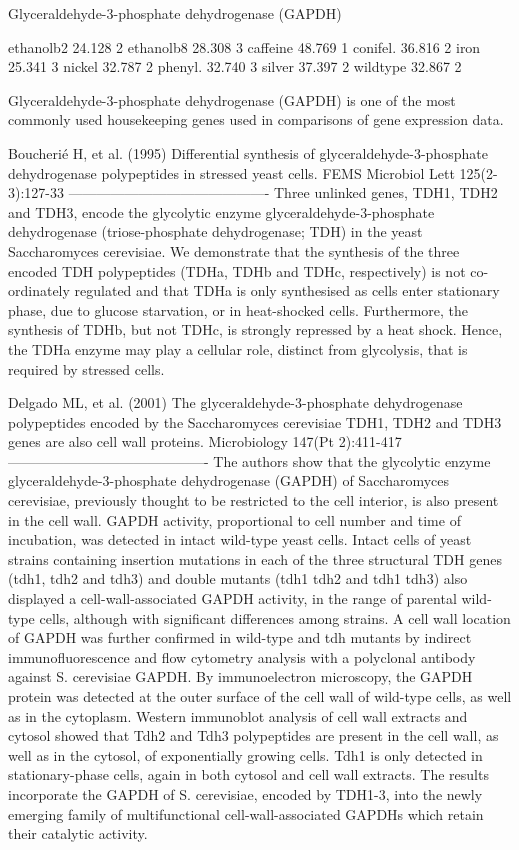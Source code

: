 Glyceraldehyde-3-phosphate dehydrogenase (GAPDH)

ethanolb2 24.128  2
ethanolb8 28.308  3
caffeine  48.769  1
conifel.  36.816  2
iron      25.341  3
nickel    32.787  2
phenyl.   32.740  3
silver    37.397  2
wildtype  32.867  2

Glyceraldehyde-3-phosphate dehydrogenase (GAPDH) is one of the most commonly used housekeeping genes used in comparisons of gene expression data.




Boucherié H, et al. (1995) Differential synthesis of glyceraldehyde-3-phosphate dehydrogenase polypeptides in stressed yeast cells. FEMS Microbiol Lett 125(2-3):127-33
 -------------------------------------------
Three unlinked genes, TDH1, TDH2 and TDH3, encode the glycolytic enzyme glyceraldehyde-3-phosphate dehydrogenase (triose-phosphate dehydrogenase; TDH) in the yeast Saccharomyces cerevisiae. We demonstrate that the synthesis of the three encoded TDH polypeptides (TDHa, TDHb and TDHc, respectively) is not co-ordinately regulated and that TDHa is only synthesised as cells enter stationary phase, due to glucose starvation, or in heat-shocked cells. Furthermore, the synthesis of TDHb, but not TDHc, is strongly repressed by a heat shock. Hence, the TDHa enzyme may play a cellular role, distinct from glycolysis, that is required by stressed cells.


Delgado ML, et al. (2001) The glyceraldehyde-3-phosphate dehydrogenase polypeptides encoded by the Saccharomyces cerevisiae TDH1, TDH2 and TDH3 genes are also cell wall proteins. Microbiology 147(Pt 2):411-417
-------------------------------------------
The authors show that the glycolytic enzyme glyceraldehyde-3-phosphate dehydrogenase (GAPDH) of Saccharomyces cerevisiae, previously thought to be restricted to the cell interior, is also present in the cell wall. GAPDH activity, proportional to cell number and time of incubation, was detected in intact wild-type yeast cells. Intact cells of yeast strains containing insertion mutations in each of the three structural TDH genes (tdh1, tdh2 and tdh3) and double mutants (tdh1 tdh2 and tdh1 tdh3) also displayed a cell-wall-associated GAPDH activity, in the range of parental wild-type cells, although with significant differences among strains. A cell wall location of GAPDH was further confirmed in wild-type and tdh mutants by indirect immunofluorescence and flow cytometry analysis with a polyclonal antibody against S. cerevisiae GAPDH. By immunoelectron microscopy, the GAPDH protein was detected at the outer surface of the cell wall of wild-type cells, as well as in the cytoplasm. Western immunoblot analysis of cell wall extracts and cytosol showed that Tdh2 and Tdh3 polypeptides are present in the cell wall, as well as in the cytosol, of exponentially growing cells. Tdh1 is only detected in stationary-phase cells, again in both cytosol and cell wall extracts. The results incorporate the GAPDH of S. cerevisiae, encoded by TDH1-3, into the newly emerging family of multifunctional cell-wall-associated GAPDHs which retain their catalytic activity.


